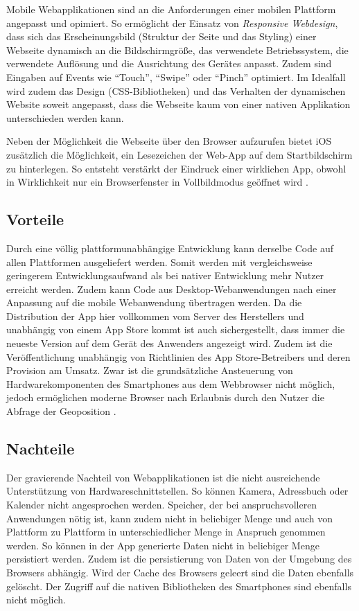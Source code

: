 Mobile Webapplikationen sind an die Anforderungen einer mobilen Plattform angepasst und opimiert. So ermöglicht der Einsatz von \emph{Responsive Webdesign}, dass sich das Erscheinungsbild (Struktur der Seite und das Styling) einer Webseite dynamisch an die Bildschirmgröße, das verwendete Betriebssystem, die verwendete Auflösung und die Ausrichtung des Gerätes anpasst. Zudem sind Eingaben auf Events wie \enquote{Touch}, \enquote{Swipe} oder \enquote{Pinch} optimiert. Im Idealfall wird zudem das Design (CSS-Bibliotheken) und das Verhalten der dynamischen Website soweit angepasst, dass die Webseite kaum von einer nativen Applikation unterschieden werden kann. 

Neben der Möglichkeit die Webseite über den Browser aufzurufen bietet iOS zusätzlich die Möglichkeit, ein Lesezeichen der Web-App auf dem Startbildschirm zu hinterlegen. So entsteht verstärkt der Eindruck einer wirklichen App, obwohl in Wirklichkeit nur ein Browserfenster in Vollbildmodus geöffnet wird \cite{safariRef}.
%
\subsection{Vorteile}
%
Durch eine völlig plattformunabhängige Entwicklung kann derselbe Code auf allen Plattformen ausgeliefert werden. Somit werden mit vergleichsweise geringerem Entwicklungsaufwand als bei nativer Entwicklung mehr Nutzer erreicht werden. Zudem kann Code aus Desktop-Webanwendungen nach einer Anpassung auf die mobile Webanwendung übertragen werden. Da die Distribution der App hier vollkommen vom Server des Herstellers und unabhängig von einem App Store kommt ist auch sichergestellt, dass immer die neueste Version auf dem Gerät des Anwenders angezeigt wird. Zudem ist die Veröffentlichung unabhängig von Richtlinien des App Store-Betreibers und deren Provision am Umsatz. Zwar ist die grundsätzliche Ansteuerung von Hardwarekomponenten des Smartphones aus dem Webbrowser nicht möglich, jedoch ermöglichen moderne Browser nach Erlaubnis durch den Nutzer die Abfrage der Geoposition \cite{browserGPS}.
%
\subsection{Nachteile}
%
Der gravierende Nachteil von Webapplikationen ist die nicht ausreichende Unterstützung von Hardwareschnittstellen. So können Kamera, Adressbuch oder Kalender nicht angesprochen werden. Speicher, der bei anspruchsvolleren Anwendungen nötig ist, kann zudem nicht in beliebiger Menge und auch von Plattform zu Plattform in unterschiedlicher Menge in Anspruch genommen werden. So können in der App generierte Daten nicht in beliebiger Menge persistiert werden. Zudem ist die persistierung von Daten von der Umgebung des Browsers abhängig. Wird der Cache des Browsers geleert sind die Daten ebenfalls gelöscht. Der Zugriff auf die nativen Bibliotheken des Smartphones sind ebenfalls nicht möglich.
%
%
